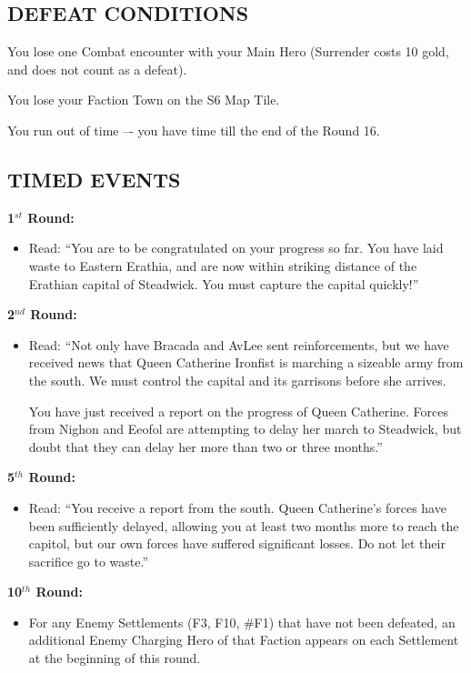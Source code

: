 \begin{multicols*}{2}
\subsection*{\MakeUppercase{Defeat Conditions}}

You lose one Combat encounter with your Main Hero (Surrender costs 10 gold, and does not count as a defeat).

You lose your Faction Town on the S6 Map Tile.

You run out of time –- you have time till the end of the Round 16.

\subsection*{\MakeUppercase{Timed Events}}

\textbf{1$^{st}$ Round:}
\begin{itemize}
  \item Read: ``You are to be congratulated on your progress so far.
    You have laid waste to Eastern Erathia, and are now within striking distance of the Erathian
    capital of Steadwick. You must capture the capital quickly!''
\end{itemize}

\textbf{2$^{nd}$ Round:}
\begin{itemize}
  \item Read: ``Not only have Bracada and AvLee sent reinforcements, but we have received news that
    Queen Catherine Ironfist is marching a sizeable army from the south. We must control the capital and its
    garrisons before she arrives.

    You have just received a report on the progress of Queen Catherine.
    Forces from Nighon and Eeofol are attempting to delay her march to Steadwick,
    but doubt that they can delay her more than two or three months.''
\end{itemize}

\textbf{5$^{th}$ Round:}
\begin{itemize}
  \item Read: ``You receive a report from the south. Queen Catherine's forces have been sufficiently delayed,
    allowing you at least two months more to reach the capitol, but our own forces have suffered significant
    losses. Do not let their sacrifice go to waste.''
\end{itemize}

\textbf{10$^{th}$ Round:}
\begin{itemize}
  \item For any Enemy Settlements (F3, F10, \#F1) that have not been defeated, an additional Enemy
    Charging Hero of that Faction appears on each Settlement at the beginning of this round.
\end{itemize}


\end{multicols*}
